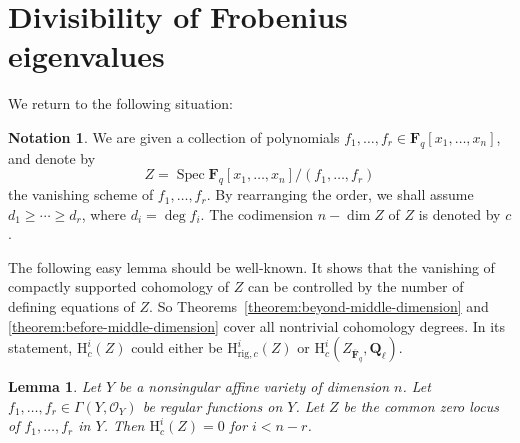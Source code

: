 \documentclass{amsart}
\numberwithin{equation}{section}
\theoremstyle{plain}
\newtheorem{lemma}[equation]{Lemma}
\theoremstyle{definition}
\newtheorem{notation}[equation]{Notation}
\renewcommand{\mathbb}{\mathbf}
\begin{document}
\section{Divisibility of Frobenius eigenvalues}
\label{sec:proof-bound}

We return to the following situation:
\begin{notation}
\label{situation:final}
We are given a collection of
polynomials \(f_1,\ldots,f_r \in \mathbb{F}_{q}[x_1,\ldots,x_n]\), and
denote by
\[
  Z = \operatorname{Spec}\mathbb{F}_q[x_1,\ldots,x_n]/(f_1,\ldots,f_r)
\]
the vanishing scheme of \(f_1,\ldots,f_r\).
By rearranging the order, we shall assume \(d_1\geq \cdots \geq d_r\),
where \(d_i=\deg f_{i}\).
The codimension \(n - \dim Z\) of \(Z\) is denoted by \(c\).
\end{notation}

The following easy lemma should be well-known.  It shows that the
vanishing of compactly supported cohomology of \(Z\) can be controlled
by the number of defining equations of \(Z\).  So
Theorems~\ref{theorem:beyond-middle-dimension} and
\ref{theorem:before-middle-dimension} cover all nontrivial cohomology
degrees.  In its statement, \(\mathrm{H}^{i}_{c}(Z)\) could either be
\(\mathrm{H}^{i}_{\mathrm{rig},c}(Z)\) or
\(\mathrm{H}^{i}_c(Z_{\overline{\mathbb{F}}_q},\mathbb{Q}_{\ell})\).

\begin{lemma}
  \label{lemma:vanishing-by-number-equations}
  Let \(Y\) be a nonsingular affine variety of dimension \(n\).
  Let \(f_1,\ldots,f_r \in \Gamma(Y,\mathcal{O}_Y)\) be regular functions on
  \(Y\). Let \(Z\) be the common zero locus of \(f_1,\ldots,f_r\)
  in \(Y\). Then \(\mathrm{H}^{i}_c(Z)=0\) for \(i < n-r\).
\end{lemma}
\end{document}
